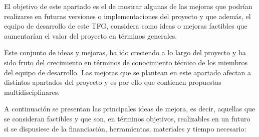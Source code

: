 El objetivo de este apartado es el de mostrar algunas de las mejoras que podrían realizarse en futuras versiones o implementaciones del proyecto y que además, el equipo de desarrollo de este TFG, considera como ideas o mejoras factibles que aumentarían el valor del proyecto en términos generales.

Este conjunto de ideas y mejoras, ha ido creciendo a lo largo del proyecto y ha sido fruto del crecimiento en términos de conocimiento técnico de los miembros del equipo de desarrollo. Las mejoras que se plantean en este apartado afectan a distintos apartados del proyecto y es por ello que contienen propuestas multidisciplinares.

A continuación se presentan las principales ideas de mejora, es decir, aquellas que se consideran factibles y que son, en términos objetivos, realizables en un futuro si se dispusiese de la financiación, herramientas, materiales y tiempo necesario:

